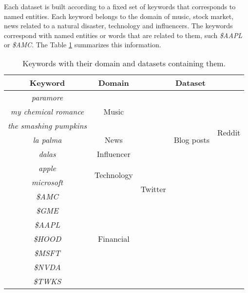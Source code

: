 Each dataset is built according to a fixed set of keywords that corresponds to named entities. Each keyword belongs to the domain of music, stock market, news related to a natural disaster, technology and influencers. The keywords correspond with named entities or words that are related to them, such \textit{\$AAPL} or \textit{\$AMC}. The Table \ref{table:keywords} summarizes this information.\\

\begin{table}[H]
	\centering
	\begin{tabular}{|c|c|c|c|c|}
		\hline
		\textbf{Keyword} & \textbf{Domain} & \multicolumn{3}{c|}{\textbf{Dataset}} \bigstrut\\
		\hline \hline
		\textit{paramore} & \multirow{3}[6]{*}{Music} & \multirow{14}[28]{*}{Twitter} & \multirow{7}[14]{*}{Blog posts} & \multirow{6}[12]{*}{Reddit} \bigstrut\\
		\cline{1-1}    \textit{my chemical romance} &       &       &       &  \bigstrut\\
		\cline{1-1}    \textit{the smashing pumpkins} &       &       &       &  \bigstrut\\
		\cline{1-2}    \textit{la palma} & News  &       &       &  \bigstrut\\
		\cline{1-2}    \textit{dalas} & Influencer &       &       &  \bigstrut\\
		\cline{1-2}    \textit{apple} & \multirow{2}[4]{*}{Technology} &       &       &  \bigstrut\\
		\cline{1-1}\cline{5-5}    \textit{microsoft} &       &       &       & \multirow{8}[16]{*}{} \bigstrut\\
		\cline{1-2}\cline{4-4}    \textit{\$AMC} & \multirow{7}[14]{*}{Financial} &       & \multirow{7}[14]{*}{} &  \bigstrut\\
		\cline{1-1}    \textit{\$GME} &       &       &       &  \bigstrut\\
		\cline{1-1}    \textit{\$AAPL} &       &       &       &  \bigstrut\\
		\cline{1-1}    \textit{\$HOOD} &       &       &       &  \bigstrut\\
		\cline{1-1}    \textit{\$MSFT} &       &       &       &  \bigstrut\\
		\cline{1-1}    \textit{\$NVDA} &       &       &       &  \bigstrut\\
		\cline{1-1}    \textit{\$TWKS} &       &       &       &  \bigstrut\\
		\hline
	\end{tabular}%
	\caption{Keywords with their domain and datasets containing them.}
	\label{table:keywords}%
\end{table}%
